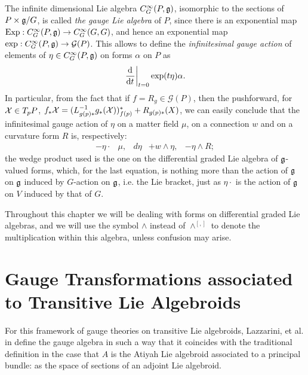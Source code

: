 The infinite dimensional Lie algebra $C^\infty_G(P, \mathfrak{g})$, isomorphic to the sections of $P \times \mathfrak{g}/G$, is called \emph{the gauge Lie algebra} of $P$, since there is an exponential map $\text{Exp}: C^\infty_G(P, \mathfrak{g}) \to C^\infty_G(G, G)$, and hence an exponential map $\text{exp}: C^\infty_G(P, \mathfrak{g}) \to \mathcal G(P)$. This allows to define the \emph{infinitesimal gauge action} of elements of $\eta \in C^\infty_G(P, \mathfrak{g})$ on forms $\alpha$ on $P$ as
\begin{equation}
    \der{t}[t=0]{\text{exp}(t\eta)} \alpha.
\end{equation}
In particular, from the fact that if $f = R_g \in \mathcal G(P)$, then the pushforward, for $\mathcal{X} \in T_pP$, $f_* \mathcal{X} = (L_{g(p) *}^{-1} g_*(\mathcal{X}))^*_{f(p)} + R_{g(p)*}(X)$, we can easily conclude that the infinitesimal gauge action of $\eta$ on a matter field $\mu$, on a connection $w$ and on a curvature form $R$ is, respectively:
\begin{align}
    -\eta \cdot & \mu, &
    d\eta &+ w \wedge \eta, &
    - \eta \wedge  R;
\end{align}
the wedge product used is the one on the differential graded Lie algebra of $\mathfrak{g}$-valued forms, which, for the last equation, is nothing more than the action of $\mathfrak{g}$ on $\mathfrak{g}$ induced by $G$-action on $\mathfrak{g}$, i.e. the Lie bracket, just as $\eta \cdot$ is the action of $\mathfrak{g}$ on $V$ induced by that of $G$. 

Throughout this chapter we will be dealing with forms on differential graded Lie algebras, and we will use the symbol $\wedge$ instead of $\wedge^{[,]}$ to denote the multiplication within this algebra, unless confusion may arise.

\section{Gauge Transformations associated to Transitive Lie Algebroids}
\label{chGaugeSectionGaugeTransformations}

For this framework of gauge theories on transitive Lie algebroids, Lazzarini, et al. in \cite{Lazzarini2012} define the gauge algebra in such a way that it coincides with the traditional definition in the case that $A$ is the Atiyah Lie algebroid associated to a principal bundle: as the space of sections of an adjoint Lie algebroid.


